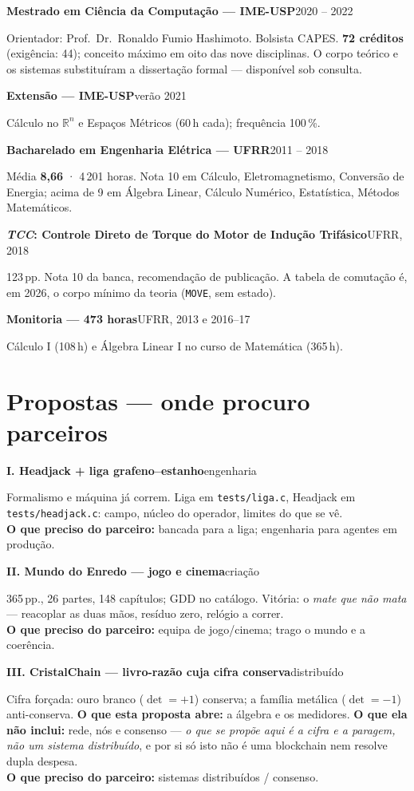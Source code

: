 \documentclass[11pt,a4paper]{article}
\newcommand{\lin}[2]{\noindent\textbf{#1}\hfill{\color{cinza}\small #2}\par}
\begin{document}
\lin{Mestrado em Ciência da Computação --- IME-USP}{2020 -- 2022}
Orientador: Prof.\ Dr.\ Ronaldo Fumio Hashimoto. Bolsista CAPES.
\textbf{72 créditos} (exigência: 44); conceito máximo em oito das nove disciplinas.
O corpo teórico e os sistemas substituíram a dissertação formal --- disponível sob consulta.

\smallskip
\lin{Extensão --- IME-USP}{verão 2021}
Cálculo no $\mathbb{R}^n$ e Espaços Métricos (60\,h cada); frequência 100\,\%.

\smallskip
\lin{Bacharelado em Engenharia Elétrica --- UFRR}{2011 -- 2018}
Média \textbf{8{,}66} · 4\,201 horas. Nota 10 em Cálculo, Eletromagnetismo, Conversão de Energia;
acima de 9 em Álgebra Linear, Cálculo Numérico, Estatística, Métodos Matemáticos.

\smallskip
\lin{\emph{TCC}: Controle Direto de Torque do Motor de Indução Trifásico}{UFRR, 2018}
123\,pp. Nota 10 da banca, recomendação de publicação. A tabela de comutação é, em 2026,
o corpo mínimo da teoria (\texttt{MOVE}, sem estado).

\smallskip
\lin{Monitoria --- 473 horas}{UFRR, 2013 e 2016--17}
Cálculo I (108\,h) e Álgebra Linear I no curso de Matemática (365\,h).

\section*{Propostas --- onde procuro parceiros}

\lin{\textbf{I.} Headjack + liga grafeno--estanho}{engenharia}
Formalismo e máquina já correm. Liga em \texttt{tests/liga.c}, Headjack em
\texttt{tests/headjack.c}: campo, núcleo do operador, limites do que se vê.
\\[1pt]
\textbf{O que preciso do parceiro:} bancada para a liga; engenharia para agentes em produção.

\smallskip
\lin{\textbf{II.} Mundo do Enredo --- jogo e cinema}{criação}
365\,pp., 26 partes, 148 capítulos; GDD no catálogo. Vitória: o \emph{mate que
não mata} --- reacoplar as duas mãos, resíduo zero, relógio a correr.
\\[1pt]
\textbf{O que preciso do parceiro:} equipa de jogo/cinema; trago o mundo e a coerência.

\smallskip
\lin{\textbf{III.} CristalChain --- livro-razão cuja cifra conserva}{distribuído}
Cifra forçada: ouro branco ($\det=+1$) conserva; a família metálica ($\det=-1$) anti-conserva.
\textbf{O que esta proposta abre:} a álgebra e os medidores. \textbf{O que ela não inclui:}
rede, nós e consenso --- \emph{o que se propõe aqui é a cifra e a paragem, não um sistema
distribuído}, e por si só isto não é uma blockchain nem resolve dupla despesa.
\\[1pt]
\textbf{O que preciso do parceiro:} sistemas distribuídos / consenso.
\end{document}
